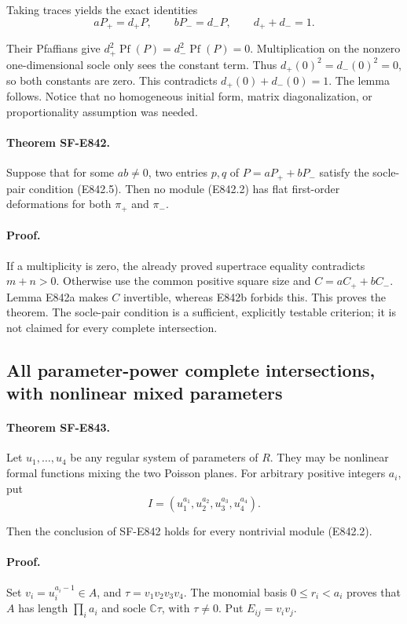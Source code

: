 Taking traces yields the exact identities
\[
             aP_+=d_+P,\qquad bP_-=d_-P,\qquad d_++d_-=1.
 \tag{E842.13}
\]

Their Pfaffians give
\(d_+^2\operatorname{Pf}(P)=d_-^2\operatorname{Pf}(P)=0\).
Multiplication on the nonzero one-dimensional socle only sees the constant
term. Thus \(d_+(0)^2=d_-(0)^2=0\), so both constants are zero.
This contradicts \(d_+(0)+d_-(0)=1\). The lemma follows.
Notice that no homogeneous initial form, matrix diagonalization,
or proportionality assumption was needed.

\paragraph{Theorem SF-E842.}
Suppose that for some \(ab\ne0\), two entries \(p,q\) of
\(P=aP_++bP_-\) satisfy the socle-pair condition (E842.5).
Then no module (E842.2) has flat first-order deformations for both
\(\pi_+\) and \(\pi_-\).

\paragraph{Proof.}
If a multiplicity is zero, the already proved supertrace equality
contradicts \(m+n>0\). Otherwise use the common positive square size and
\(C=aC_++bC_-\). Lemma E842a makes \(C\) invertible, whereas E842b
forbids this. This proves the theorem. The socle-pair condition is a
sufficient, explicitly testable criterion; it is not claimed for every
complete intersection.

\subsection{All parameter-power complete intersections, with nonlinear mixed parameters}
\label{SF-E843:powers}

\paragraph{Theorem SF-E843.}
Let \(u_1,\ldots,u_4\) be any regular system of parameters of \(R\).
They may be nonlinear formal functions mixing the two Poisson planes.
For arbitrary positive integers \(a_i\), put
\[
                  I=(u_1^{a_1},u_2^{a_2},u_3^{a_3},u_4^{a_4}).
 \tag{E843.1}
\]

Then the conclusion of SF-E842 holds for every nontrivial module (E842.2).

\paragraph{Proof.}
Set \(v_i=u_i^{a_i-1}\in A\), and \(\tau=v_1v_2v_3v_4\).
The monomial basis \(0\le r_i<a_i\) proves that \(A\) has length
\(\prod_i a_i\) and socle \(\mathbb C\tau\), with \(\tau\ne0\).
Put \(E_{ij}=v_iv_j\).

